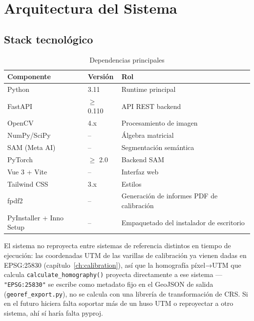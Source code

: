 \chapter{Arquitectura del Sistema}
\label{ch:architecture}

\section{Stack tecnológico}

\begin{table}[H]
\centering
\caption{Dependencias principales}
\label{tab:stack}
\begin{tabular}{L{4cm} L{3.5cm} L{5cm}}
\toprule
\textbf{Componente} & \textbf{Versión} & \textbf{Rol} \\
\midrule
Python        & 3.11         & Runtime principal \\
FastAPI       & $\geq$ 0.110 & API REST backend \\
OpenCV        & 4.x          & Procesamiento de imagen \\
NumPy/SciPy   & --           & Álgebra matricial \\
SAM (Meta AI) & --           & Segmentación semántica \\
PyTorch       & $\geq$ 2.0   & Backend SAM \\
Vue 3 + Vite  & --           & Interfaz web \\
Tailwind CSS  & 3.x          & Estilos \\
fpdf2         & --           & Generación de informes PDF de calibración \\
PyInstaller + Inno Setup & -- & Empaquetado del instalador de escritorio \\
\bottomrule
\end{tabular}
\end{table}

\begin{infobox}
El sistema no reproyecta entre sistemas de referencia distintos en tiempo de ejecución: las
coordenadas UTM de las varillas de calibración ya vienen dadas en EPSG:25830 (capítulo~\ref{ch:calibration}),
así que la homografía píxel→UTM que calcula \texttt{calculate\_homography()} proyecta
directamente a ese sistema — \texttt{"EPSG:25830"} se escribe como metadato fijo en el GeoJSON
de salida (\texttt{georef\_export.py}), no se calcula con una librería de transformación de CRS.
Si en el futuro hiciera falta soportar más de un huso UTM o reproyectar a otro sistema, ahí sí
haría falta pyproj.
\end{infobox}

